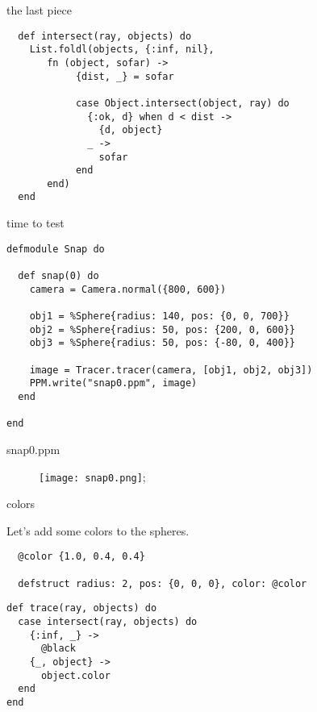 \begin{frame}[fragile]{the last piece}

\begin{verbatim}
  def intersect(ray, objects) do
    List.foldl(objects, {:inf, nil}, 
       fn (object, sofar) ->
            {dist, _} = sofar

            case Object.intersect(object, ray) do
              {:ok, d} when d < dist ->
                {d, object}
              _ ->
                sofar
            end
       end)
  end
\end{verbatim}

\end{frame}

\begin{frame}[fragile]{time to test}
\begin{verbatim}
defmodule Snap do

  def snap(0) do
    camera = Camera.normal({800, 600})

    obj1 = %Sphere{radius: 140, pos: {0, 0, 700}}
    obj2 = %Sphere{radius: 50, pos: {200, 0, 600}}
    obj3 = %Sphere{radius: 50, pos: {-80, 0, 400}}

    image = Tracer.tracer(camera, [obj1, obj2, obj3])
    PPM.write("snap0.ppm", image)
  end

end
\end{verbatim}
\end{frame}

\begin{frame}{snap0.ppm}

\begin{figure}
\texttt{[image: snap0.png]};
\end{figure}

\end{frame}


\begin{frame}[fragile]{colors}

\pause Let's add some colors to the spheres.

\begin{verbatim}
  @color {1.0, 0.4, 0.4}

  defstruct radius: 2, pos: {0, 0, 0}, color: @color 
\end{verbatim}

\pause
\begin{verbatim}
def trace(ray, objects) do
  case intersect(ray, objects) do
    {:inf, _} ->
      @black
    {_, object} ->
      object.color
  end
end
\end{verbatim}
\end{frame}



